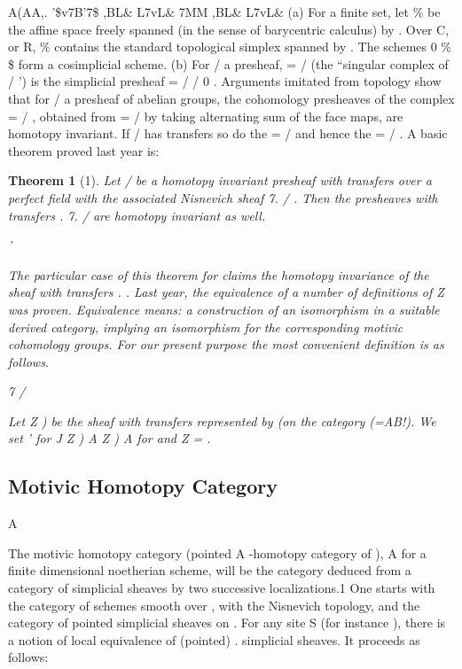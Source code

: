 \documentclass[11pt,a4paper]{article}
\theoremstyle{plain}
\newtheorem{theorem}{Theorem}
\theoremstyle{definition}
\begin{document}
 A(AA,. '\$v7B'7\$ ,BL\& L7vL\&  7MM ,BL\& L7vL\&
(a) For  a finite set, let \% be the affine space freely spanned (in the sense of
barycentric calculus) by  . Over C, or R, \% contains the standard topological simplex spanned by  . The schemes 0
\%  \$  form a
cosimplicial scheme.
(b) For / a presheaf, = /  (the ``singular complex of / ') is the simplicial
presheaf = /    /  0 .
Arguments imitated from topology show that for / a presheaf of abelian groups,
the cohomology presheaves of the complex = / , obtained from = /  by taking
alternating sum of the face maps, are homotopy invariant. If / has transfers so do
the = /  and hence the  = / . A basic theorem proved last year is:
\begin{theorem}[1]
Let / be a homotopy invariant presheaf with transfers over a perfect field with the associated Nisnevich sheaf 7.   / . Then the presheaves with
transfers
    .    7.   / 
are homotopy invariant as well.

' 

The particular case of this theorem for
claims the homotopy invariance of
the sheaf with transfers .  
.
Last year, the equivalence of a number of definitions of Z
was proven. Equivalence means: a construction of an isomorphism in a suitable derived category,
implying an isomorphism for the corresponding motivic cohomology groups. For
our present purpose the most convenient definition is as follows.

7 / 





Let Z )  be the sheaf with transfers represented by  (on the category
(=AB!). We set
'
for  J 
Z ) A Z ) A    for   
and Z =  .

\end{theorem}

\subsection{Motivic Homotopy Category}


A 



The motivic homotopy category
(pointed A -homotopy category of ),
A 
for a finite dimensional noetherian scheme, will be the category deduced from a
category of simplicial sheaves by two successive localizations.1
One starts with the category
of schemes smooth over , with the Nisnevich topology, and the category of pointed simplicial sheaves on
. For any
site S (for instance
),
there
is
a
notion
of
local
equivalence
of
(pointed)
. 
simplicial sheaves. It proceeds as follows:
\end{document}
